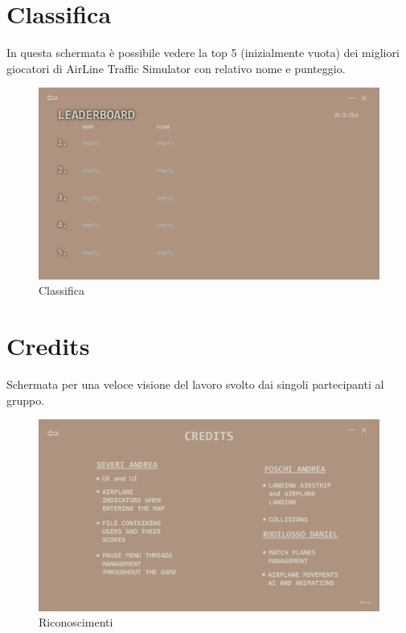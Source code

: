 \documentclass[a4paper,12pt]{report}
\begin{document}
\clearpage

\section*{Classifica}
In questa schermata è possibile vedere la top 5 (inizialmente vuota) dei migliori giocatori di AirLine Traffic Simulator con relativo nome e punteggio.
\begin{figure}[H]
    \begin{center}
        \centering
        \includegraphics[width=\textwidth]{img/GuidaUtente/Leaderboard.png}
    \end{center}
    \caption{Classifica}
    \label{img:leaderboard-png}
\end{figure}

\clearpage

\section*{Credits}
Schermata per una veloce visione del lavoro svolto dai singoli partecipanti al gruppo.
\begin{figure}[H]
    \begin{center}
        \centering
        \includegraphics[width=\textwidth]{img/GuidaUtente/Credits.png}
    \end{center}
    \caption{Riconoscimenti}
    \label{img:credits}
\end{figure}
\end{document}
